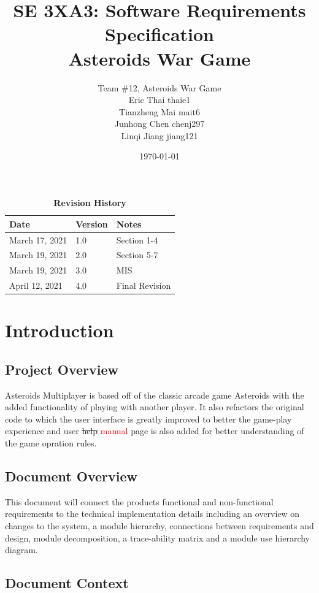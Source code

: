 \documentclass[12pt, titlepage]{article}
\title{SE 3XA3: Software Requirements Specification\\Asteroids War Game}
\author{Team \#12, Asteroids War Game
		\\ Eric Thai thaie1
		\\ Tianzheng Mai mait6
		\\ Junhong Chen chenj297
		\\ Linqi Jiang jiang121
}
\date{\today}
\begin{document}
\begin{table}[bp]
\centering
\caption{\bf Revision History}
\begin{tabularx}{\textwidth}{p{3cm}p{2cm}X}
\toprule {\bf Date} & {\bf Version} & {\bf Notes}\\
\midrule
March 17, 2021 & 1.0 & Section 1-4\\
March 19, 2021 & 2.0 & Section 5-7\\
March 19, 2021 & 3.0 & MIS\\
April 12, 2021 & 4.0 & Final Revision\\
\bottomrule
\end{tabularx}
\end{table}


\maketitle

\tableofcontents
\listoftables
\listoffigures


\newpage


\section{Introduction}
\subsection{Project Overview} \label{SecAchange}
Asteroids Multiplayer is based off of the classic arcade game Asteroids with the added functionality of playing with another player. It also refactors the original code to which the user interface is greatly improved to better the game-play experience and user \sout{help} \textcolor{red}{manual} page is also added for better understanding of the game opration rules.
\subsection{Document Overview} \label{SecAchange}
This document will connect the products functional and non-functional requirements to the technical implementation details including an overview on changes to the system, a module hierarchy, connections between requirements and design, module decomposition, a trace-ability matrix and a module use hierarchy diagram.
\subsection{Document Context} \label{SecAchange}
\end{document}
